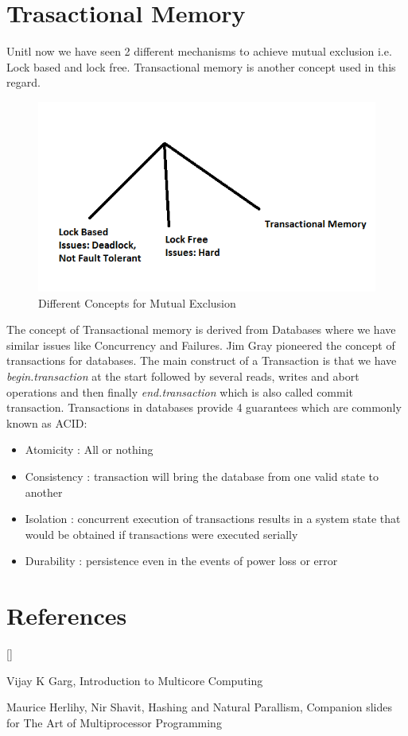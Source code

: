 \documentclass[twoside]{article}
\def\beginrefs{\begin{list}%
        {[\arabic{equation}]}{\usecounter{equation}
         \setlength{\leftmargin}{2.0truecm}\setlength{\labelsep}{0.4truecm}%
         \setlength{\labelwidth}{1.6truecm}}}
\def\endrefs{\end{list}}
\def\bibentry#1{\item[\hbox{[#1]}]}
\begin{document}
\section{Trasactional Memory}
Unitl now we have seen 2 different mechanisms to achieve mutual exclusion i.e. Lock based and lock free. Transactional memory is another concept used in this regard. \\
\begin{figure}[h]
\centering
\includegraphics[scale=0.5]{illus}
\caption{Different Concepts for Mutual Exclusion}
\label{fig:4}
\end{figure}

The concept of Transactional memory is derived from Databases where we have similar issues like Concurrency and Failures. Jim Gray pioneered the concept of transactions for databases. The main construct of a Transaction is that we have \textit{begin.transaction} at the start followed by several reads, writes and abort operations and then finally \textit{end.transaction} which is also called commit transaction.  
Transactions in databases provide 4 guarantees which are commonly known as ACID:
\begin{itemize}
\item Atomicity : All or nothing
\item Consistency : transaction will bring the database from one valid state to another
\item Isolation  : concurrent execution of transactions results in a system state that would be obtained if transactions were executed serially
\item Durability : persistence even in the events of power loss or error
\end{itemize}

\section*{References}
\beginrefs
\bibentry{1}{\sc Vijay K Garg},
Introduction to Multicore Computing
\bibentry{2}{\sc Maurice Herlihy, Nir Shavit}, Hashing and Natural Parallism, Companion slides for
The Art of Multiprocessor Programming
\endrefs
\end{document}
